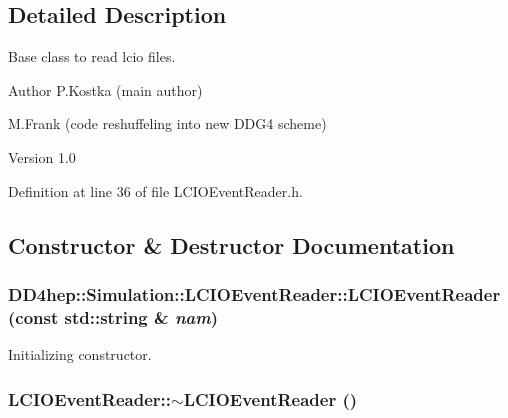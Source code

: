 \subsection{Detailed Description}
Base class to read lcio files. \begin{DoxyAuthor}{Author}
P.Kostka (main author) 

M.Frank (code reshuffeling into new DDG4 scheme) 
\end{DoxyAuthor}
\begin{DoxyVersion}{Version}
1.0 
\end{DoxyVersion}


Definition at line 36 of file LCIOEventReader.h.

\subsection{Constructor \& Destructor Documentation}
\hypertarget{class_d_d4hep_1_1_simulation_1_1_l_c_i_o_event_reader_ac64aa140499c254ba45518732e88c118}{
\subsubsection[{LCIOEventReader}]{\setlength{\rightskip}{0pt plus 5cm}DD4hep::Simulation::LCIOEventReader::LCIOEventReader (const std::string \& {\em nam})}}
\label{class_d_d4hep_1_1_simulation_1_1_l_c_i_o_event_reader_ac64aa140499c254ba45518732e88c118}


Initializing constructor. \hypertarget{class_d_d4hep_1_1_simulation_1_1_l_c_i_o_event_reader_ad352960abd7fd0ff6c7e90775ba7be83}{
\subsubsection[{$\sim$LCIOEventReader}]{\setlength{\rightskip}{0pt plus 5cm}LCIOEventReader::$\sim$LCIOEventReader ()}}
\label{class_d_d4hep_1_1_simulation_1_1_l_c_i_o_event_reader_ad352960abd7fd0ff6c7e90775ba7be83}


